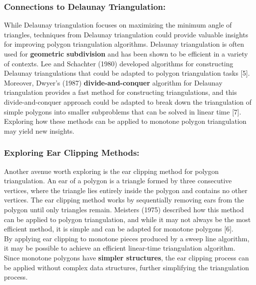 \documentclass{article}
\begin{document}
\subsubsection*{Connections to Delaunay Triangulation: }
While Delaunay triangulation focuses on maximizing the minimum angle of triangles, techniques from Delaunay triangulation could provide valuable insights for improving polygon triangulation algorithms. Delaunay triangulation is often used for \textbf{geometric subdivision} and has been shown to be efficient in a variety of contexts. Lee and Schachter (1980) developed algorithms for constructing Delaunay triangulations that could be adapted to polygon triangulation tasks [5].
Moreover, Dwyer's (1987) \textbf{divide-and-conquer} algorithm for Delaunay triangulation provides a fast method for constructing triangulations, and this divide-and-conquer approach could be adapted to break down the triangulation of simple polygons into smaller subproblems that can be solved in linear time [7]. Exploring how these methods can be applied to monotone polygon triangulation may yield new insights.

\subsubsection*{Exploring Ear Clipping Methods:}
Another avenue worth exploring is the ear clipping method for polygon triangulation. An ear of a polygon is a triangle formed by three consecutive vertices, where the triangle lies entirely inside the polygon and contains no other vertices. The ear clipping method works by sequentially removing ears from the polygon until only triangles remain. Meisters (1975) described how this method can be applied to polygon triangulation, and while it may not always be the most efficient method, it is simple and can be adapted for monotone polygons [6].
\\
By applying ear clipping to monotone pieces produced by a sweep line algorithm, it may be possible to achieve an efficient linear-time triangulation algorithm. Since monotone polygons have \textbf{simpler structures}, the ear clipping process can be applied without complex data structures, further simplifying the triangulation process.
\end{document}

